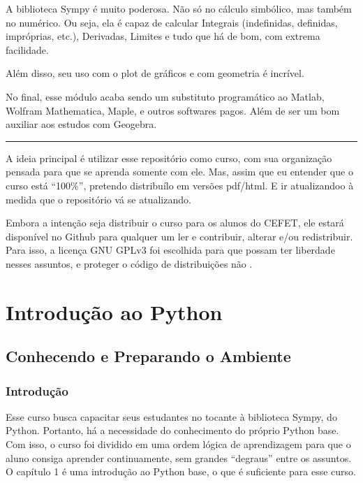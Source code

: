 \documentclass[letterpaper,10pt,english]{jupyterBook}
\begin{document}
\sphinxAtStartPar
A biblioteca Sympy é muito poderosa. Não só no cálculo simbólico, mas também no numérico. Ou seja, ela é capaz de calcular Integrais (indefinidas, definidas, impróprias, etc.), Derivadas, Limites e tudo que há de bom, com extrema facilidade.

\sphinxAtStartPar
Além disso, seu uso com o plot de gráficos e com geometria é incrível.

\sphinxAtStartPar
No final, esse módulo acaba sendo um substituto programático ao Matlab, Wolfram Mathematica, Maple, e outros softwares pagos. Além de ser um bom auxiliar aos estudos com Geogebra.


\bigskip\hrule\bigskip


\sphinxAtStartPar
A ideia principal é utilizar esse repositório como curso, com sua organização pensada para que se aprenda somente com ele. Mas, assim que eu entender que o curso está “100\%”, pretendo distribuí\sphinxhyphen{}lo em versões pdf/html. E ir atualizando\sphinxhyphen{}o à medida que o repositório vá se atualizando.

\begin{DUlineblock}{0em}
\item[] 
\end{DUlineblock}

\sphinxAtStartPar
Embora a intenção seja distribuir o curso para os alunos do CEFET, ele estará disponível no Github para qualquer um ler e contribuir, alterar e/ou redistribuir. Para isso, a licença GNU GPLv3 foi escolhida para que possam ter liberdade nesses assuntos, e proteger o código de distribuições não .


\part{Introdução ao Python}


\chapter{Conhecendo e Preparando o Ambiente}
\label{\detokenize{chapters/1:conhecendo-e-preparando-o-ambiente}}\label{\detokenize{chapters/1::doc}}

\section{Introdução}
\label{\detokenize{chapters/1:introducao}}
\sphinxAtStartPar
Esse curso busca capacitar seus estudantes no tocante à biblioteca Sympy, do Python. Portanto, há a necessidade do conhecimento do próprio Python base. Com isso, o curso foi dividido em uma ordem lógica de aprendizagem para que o aluno consiga aprender continuamente, sem grandes “degraus” entre os assuntos. O capítulo 1 é uma introdução ao Python base, o que é suficiente para esse curso.
\end{document}
